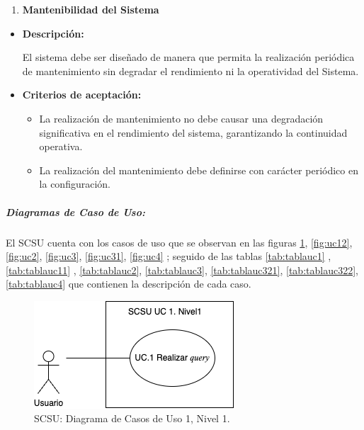 \documentclass[
  12pt,
  openany]{book}
\providecommand{\tightlist}{%
  \setlength{\itemsep}{0pt}\setlength{\parskip}{0pt}}
\begin{document}
\begin{enumerate}
\def\labelenumi{\arabic{enumi}.}
\setcounter{enumi}{5}
\tightlist
\item
  \textbf{Mantenibilidad del Sistema}
\end{enumerate}

\begin{itemize}
\item
  \textbf{Descripción:}

  El sistema debe ser diseñado de manera que permita la realización periódica de mantenimiento sin degradar el rendimiento ni la operatividad del Sistema.
\item
  \textbf{Criterios de aceptación:}

  \begin{itemize}
  \item
    La realización de mantenimiento no debe causar una degradación significativa en el rendimiento del sistema, garantizando la continuidad operativa.
  \item
    La realización del mantenimiento debe definirse con carácter periódico en la configuración.
  \end{itemize}
\end{itemize}

\hypertarget{diagramas-de-caso-de-uso}{%
\subparagraph{Diagramas de Caso de Uso:}\label{diagramas-de-caso-de-uso}}

El SCSU cuenta con los casos de uso que se observan en las figuras \ref{fig:uc1}, \ref{fig:uc12}, \ref{fig:uc2}, \ref{fig:uc3}, \ref{fig:uc31}, \ref{fig:uc4} ; seguido de las tablas \ref{tab:tablauc1} ,\ref{tab:tablauc11} , \ref{tab:tablauc2}, \ref{tab:tablauc3}, \ref{tab:tablauc321}, \ref{tab:tablauc322}, \ref{tab:tablauc4} que contienen la descripción de cada caso.

\begin{figure}

{\centering \includegraphics[width=0.4\linewidth]{images/05-desarrollo/4_ciclo/UC/SCSU_UC1_nivel1} 

}

\caption{SCSU: Diagrama de Casos de Uso 1, Nivel 1.}\label{fig:uc1}
\end{figure}
\end{document}

